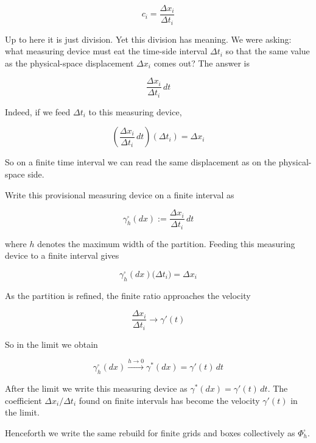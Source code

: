 \documentclass[a4paper,12pt,openany]{book}
\begin{document}
\[c_i = \frac{\Delta x_i}{\Delta t_i}\]

Up to here it is just division. Yet this division has meaning. We were
asking: what measuring device must eat the time-side interval
\(\Delta t_i\) so that the same value as the physical-space displacement
\(\Delta x_i\) comes out? The answer is

\[\frac{\Delta x_i}{\Delta t_i}\,dt\]

Indeed, if we feed \(\Delta t_i\) to this measuring device,

\[\left(\frac{\Delta x_i}{\Delta t_i}\,dt\right)(\Delta t_i)=\Delta x_i\]

So on a finite time interval we can read the same displacement as on the
physical-space side.

Write this provisional measuring device on a finite interval as

\[\gamma_h^\square(dx):=\frac{\Delta x_i}{\Delta t_i}\,dt\]

where \(h\) denotes the maximum width of the partition. Feeding this
measuring device to a finite interval gives

\[\gamma_h^\square(dx)\bigl(\Delta t_i\bigr)=\Delta x_i\]

As the partition is refined, the finite ratio approaches the velocity

\[\frac{\Delta x_i}{\Delta t_i}\to \gamma'(t)\]

So in the limit we obtain

\[
\gamma_h^\square(dx)
\xrightarrow{h\to0}
\gamma^*(dx)
=
\gamma'(t)\,dt
\]

After the limit we write this measuring device as
\(\gamma^*(dx)=\gamma'(t)\,dt\). The coefficient
\(\Delta x_i/\Delta t_i\) found on finite intervals has become the
velocity \(\gamma'(t)\) in the limit.

Henceforth we write the same rebuild for finite grids and boxes
collectively as \(\Phi_h^\square\).
\end{document}
